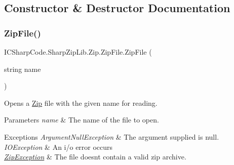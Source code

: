 \subsection{Constructor \& Destructor Documentation}
\mbox{\label{class_i_c_sharp_code_1_1_sharp_zip_lib_1_1_zip_1_1_zip_file_aa418da27fd51ba771192002ae94f1595}} 
\subsubsection{\texorpdfstring{Zip\+File()}{ZipFile()}\hspace{0.1cm}{\footnotesize\ttfamily [1/3]}}
{\footnotesize\ttfamily I\+C\+Sharp\+Code.\+Sharp\+Zip\+Lib.\+Zip.\+Zip\+File.\+Zip\+File (\begin{DoxyParamCaption}\item[{string}]{name }\end{DoxyParamCaption})\hspace{0.3cm}{\ttfamily [inline]}}



Opens a \hyperlink{namespace_i_c_sharp_code_1_1_sharp_zip_lib_1_1_zip}{Zip} file with the given name for reading. 


\begin{DoxyParams}{Parameters}
{\em name} & The name of the file to open.\\
\hline
\end{DoxyParams}

\begin{DoxyExceptions}{Exceptions}
{\em Argument\+Null\+Exception} & The argument supplied is null.\\
\hline
{\em I\+O\+Exception} & An i/o error occurs \\
\hline
{\em \hyperlink{class_i_c_sharp_code_1_1_sharp_zip_lib_1_1_zip_1_1_zip_exception}{Zip\+Exception}} & The file doesn\textquotesingle{}t contain a valid zip archive. \\
\hline
\end{DoxyExceptions}
\mbox{\label{class_i_c_sharp_code_1_1_sharp_zip_lib_1_1_zip_1_1_zip_file_a210dba0f633ebede45066aa3f50d79d1}} 
